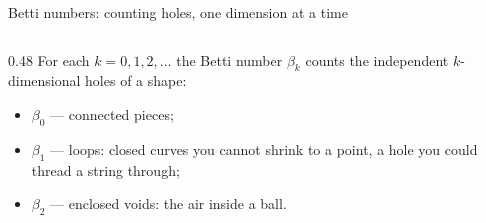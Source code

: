 \documentclass[10pt,aspectratio=169]{beamer}
\newcommand{\HL}[1]{\textcolor{blue!70!black}{#1}}
\begin{document}
    \begin{frame}{Betti numbers: counting holes, one dimension at a time}
        \begin{columns}[T,onlytextwidth]
            \begin{column}{0.48\textwidth}
                \footnotesize
                For each $k=0,1,2,\dots$ the \HL{Betti number} $\beta_k$ counts the
                independent $k$-dimensional holes of a shape:
                \begin{itemize}
                    \item $\beta_0$ --- connected pieces;
                    \item $\beta_1$ --- loops: closed curves you cannot shrink to a
                    point, a hole you could thread a string through;
                    \item $\beta_2$ --- enclosed voids: the air inside a ball.
                \end{itemize}


\end{column}
\end{columns}
\end{frame}
\end{document}
